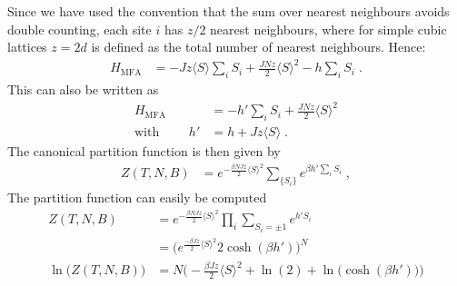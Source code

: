 %
Since we have used the convention that the sum over nearest neighbours avoids
double counting, each site $i$ has $z/2$ nearest neighbours, where for simple cubic lattices $z=2d$ is defined as the total number of nearest neighbours.
Hence:
%
\begin{align*} %
H_\text{MFA} 
&= - J z  \langle S \rangle \sum_{i}  S_{i}
+ \frac{J N z}{2}  \langle S \rangle^{2}
  - h
\sum_{i} S_{i} \;.
\end{align*}
%
%
This can also be written as
\begin{align}\label{eq:ising:H:mfa}
H_\text{MFA} &=
  - h '\sum_{i} S_{i}
+ \frac{J N z}{2}  \langle S \rangle^{2}
 \\
\text{with }\qquad h' &= h + Jz \langle S \rangle\;.
\end{align}
The canonical partition function is then given by
%
\begin{align}\label{eq:ising:mfa:aux1}
Z(T,N,B) &= e^{-\frac{ \beta N J z}{2}\langle S \rangle^{2}} \sum_{\{S_{i}\}} e^{\beta h'\sum_{i}S_{i}}\;,
\end{align}
%
The partition function can easily be computed
%
\begin{align}\label{eq:}
Z(T,N,B) &= e^{-\frac{\beta N J z}{2} \langle S \rangle^{2}}\prod_{i} \sum_{S_{i}=\pm 1} e^{h' S_{i}} \nonumber\\
&= \bigg(  e^{\frac{-\beta J z}{2} \langle S \rangle^{2}}2 \cosh(\beta h') \bigg)^{N}\\
\ln\big( Z(T,N,B)  \big)
&= N \bigg( -\frac{\beta J z}{2} \langle S \rangle^{2} 
+\ln(2) 
+\ln\big( \cosh(\beta h')   \big) 
\bigg)
\label{eq:Z:Ising:MFA}
\end{align}
%
